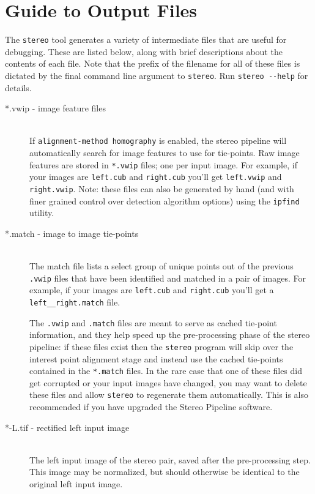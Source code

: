 \chapter{Guide to Output Files}
\label{chapter:outputfiles}

The {\tt stereo} tool generates a variety of intermediate files that
are useful for debugging.  These are listed below, along with brief
descriptions about the contents of each file.  Note that the prefix of
the filename for all of these files is dictated by the final command
line argument to {\tt stereo}.  Run {\tt stereo -\/-help} for details.

\begin{description}

\item[*.vwip \textnormal{- image feature files}] \hfill \\
  If \texttt{alignment-method homography} is enabled, the stereo
  pipeline will automatically search for image features to use for
  tie-points.  Raw image features are stored in \texttt{*.vwip} files;
  one per input image. For example, if your images are
  \texttt{left.cub} and \texttt{right.cub} you'll get
  \texttt{left.vwip} and \texttt{right.vwip}.  Note: these files can
  also be generated by hand (and with finer grained control over
  detection algorithm options) using the {\tt ipfind} utility.

\item[*.match \textnormal{- image to image tie-points}] \hfill \\
  The match file lists a select group of unique points out of the
  previous \texttt{.vwip} files that have been identified and matched
  in a pair of images.  For example, if your images are
  \texttt{left.cub} and \texttt{right.cub} you'll get a
  \texttt{left\_\_right.match} file.

  The \texttt{.vwip} and \texttt{.match} files are meant to serve
  as cached tie-point information, and they help speed up the
  pre-processing phase of the stereo pipeline: if these files exist
  then the \texttt{stereo} program will skip over the interest point
  alignment stage and instead use the cached tie-points contained
  in the \texttt{*.match} files.  In the rare case that one of these files
  did get corrupted or your input images have changed, you may want
  to delete these files and allow {\tt stereo} to regenerate them
  automatically.  This is also recommended if you have upgraded the
  Stereo Pipeline software.

\item[*-L.tif - \textnormal{rectified left input image}] \hfill \\
  The left input image of the stereo pair, saved after the
  pre-processing step.  This image may be normalized, but should
  otherwise be identical to the original left input image.


\end{description}
